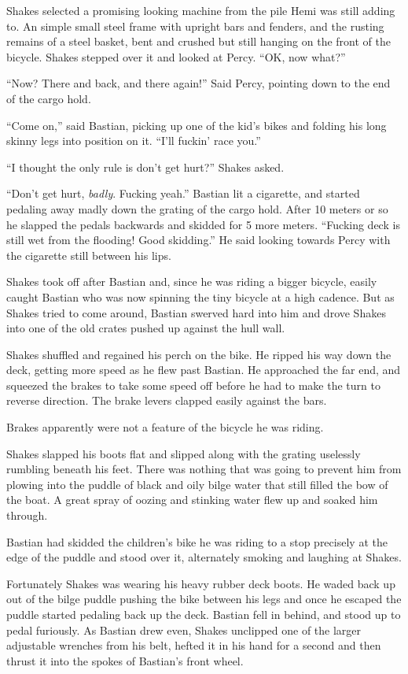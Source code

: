 \documentclass[
]{scrbook}
\begin{document}
Shakes selected a promising looking machine from the pile Hemi was still
adding to. An simple small steel frame with upright bars and fenders,
and the rusting remains of a steel basket, bent and crushed but still
hanging on the front of the bicycle. Shakes stepped over it and looked
at Percy. ``OK, now what?''

``Now? There and back, and there again!'' Said Percy, pointing down to
the end of the cargo hold.

``Come on,'' said Bastian, picking up one of the kid's bikes and folding
his long skinny legs into position on it. ``I'll fuckin' race you.''

``I thought the only rule is don't get hurt?'' Shakes asked.

``Don't get hurt, \emph{badly}. Fucking yeah.'' Bastian lit a cigarette,
and started pedaling away madly down the grating of the cargo hold.
After 10 meters or so he slapped the pedals backwards and skidded for 5
more meters. ``Fucking deck is still wet from the flooding! Good
skidding.'' He said looking towards Percy with the cigarette still
between his lips.

Shakes took off after Bastian and, since he was riding a bigger bicycle,
easily caught Bastian who was now spinning the tiny bicycle at a high
cadence. But as Shakes tried to come around, Bastian swerved hard into
him and drove Shakes into one of the old crates pushed up against the
hull wall.

Shakes shuffled and regained his perch on the bike. He ripped his way
down the deck, getting more speed as he flew past Bastian. He approached
the far end, and squeezed the brakes to take some speed off before he
had to make the turn to reverse direction. The brake levers clapped
easily against the bars.

Brakes apparently were not a feature of the bicycle he was riding.

Shakes slapped his boots flat and slipped along with the grating
uselessly rumbling beneath his feet. There was nothing that was going to
prevent him from plowing into the puddle of black and oily bilge water
that still filled the bow of the boat. A great spray of oozing and
stinking water flew up and soaked him through.

Bastian had skidded the children's bike he was riding to a stop
precisely at the edge of the puddle and stood over it, alternately
smoking and laughing at Shakes.

Fortunately Shakes was wearing his heavy rubber deck boots. He waded
back up out of the bilge puddle pushing the bike between his legs and
once he escaped the puddle started pedaling back up the deck. Bastian
fell in behind, and stood up to pedal furiously. As Bastian drew even,
Shakes unclipped one of the larger adjustable wrenches from his belt,
hefted it in his hand for a second and then thrust it into the spokes of
Bastian's front wheel.
\end{document}
